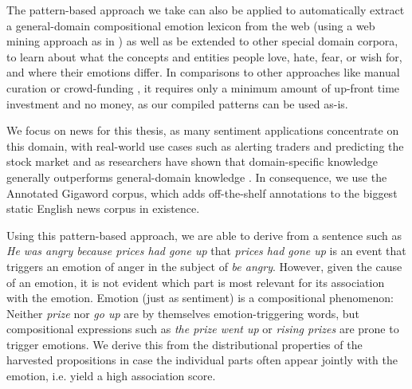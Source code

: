 The pattern-based approach we take can also be applied to automatically extract a general-domain compositional emotion lexicon from the web (using a web mining approach as in \cite{mutual_action}) as well as be extended to other special domain corpora, to learn about what the concepts and entities people love, hate, fear, or wish for, and where their emotions differ. In comparisons to other approaches like manual curation or crowd-funding \cite{nrc}, it requires only a minimum amount of up-front time investment and no money, as our compiled patterns can be used as-is.

We focus on news for this thesis, as many sentiment applications concentrate on this domain, with real-world use cases such as alerting traders and predicting the stock market \cite{predict_stock_market} and as researchers have shown that domain-specific knowledge generally outperforms general-domain knowledge \cite{implicit_emotions}. In consequence, we use the Annotated Gigaword \cite{annotated_gigaword} corpus, which adds off-the-shelf annotations to the biggest static English news corpus in existence.

Using this pattern-based approach, we are able to derive from a sentence such as \textit{He was angry because prices had gone up} that \textit{prices had gone up} is an event that triggers an emotion of anger in the subject of \textit{be angry}. However, given the cause of an emotion, it is not evident which part is most relevant for its association with the emotion. Emotion (just as sentiment) is a compositional phenomenon: Neither \textit{prize} nor \textit{go up} are by themselves emotion-triggering words, but compositional expressions such as \textit{the prize went up} or \textit{rising prizes} are prone to trigger emotions. We derive this from the distributional properties of the harvested propositions in case the individual parts often appear jointly with the emotion, i.e. yield a high association score.

